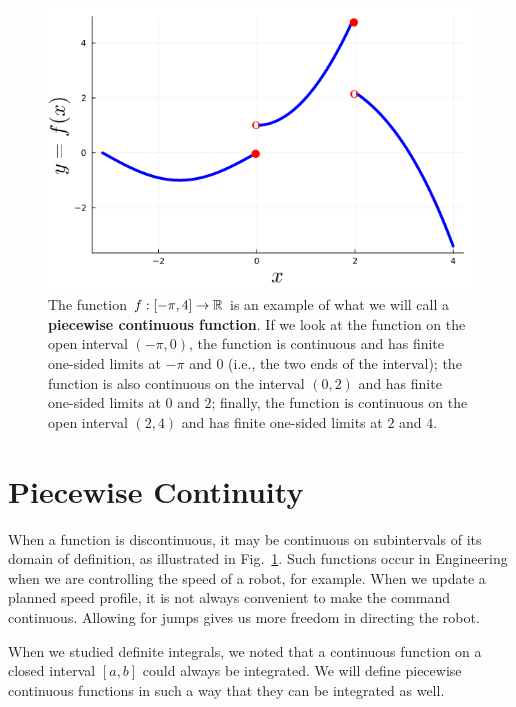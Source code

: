 \begin{figure}[htb]%
\centering
\includegraphics[width=0.4\columnwidth]{graphics/Chap04/PiecewiseExample01.png}%
    \caption[]{The function $f:[-\pi, 4] \to \mathbb R$ is an example of what we will call a \textbf{piecewise continuous function}. If we look at the function on the open interval $(-\pi, 0)$,  the function is continuous and has finite one-sided limits at $-\pi$ and 0 (i.e., the two ends of the interval); the function is also continuous on the interval $(0, 2)$ and has finite one-sided limits at $0$ and $2$; finally, the function is continuous on the open interval $(2, 4)$ and has finite one-sided limits at $2$ and $4$.}
    \label{fig:PiecewiseExample01}
\end{figure}


\section{Piecewise Continuity}

When a function is discontinuous, it may be continuous on subintervals of its domain of definition, as illustrated in Fig.~\ref{fig:PiecewiseExample01}. Such functions occur in Engineering when we are controlling the speed of a robot, for example. When we update a planned speed profile, it is not always convenient to make the command continuous. Allowing for jumps gives us more freedom in directing the robot. 

When we studied definite integrals, we noted that a continuous function on a closed interval $[a, b]$ could always be integrated. We will define piecewise continuous functions in such a way that they can be integrated as well. 

